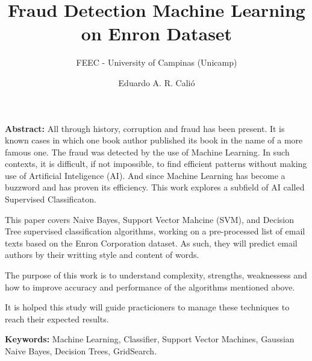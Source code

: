 \documentclass[11pt]{article}
\title{Fraud Detection Machine Learning on Enron Dataset}
\author{Eduardo A. R. Calió}
\subtitle{FEEC - University of Campinas (Unicamp)}
\begin{document}
    
    
    \maketitle
  
\begin{footnotesize}
\textbf{Abstract:} All through history, corruption and fraud has been present. It is known
cases in which one book author published its book in the name of a more
famous one. The fraud was detected by the use of Machine Learning. In
such contexts, it is difficult, if not impossible, to find efficient
patterns without making use of Artificial Inteligence (AI). And since
Machine Learning has become a buzzword and has proven its efficiency.
This work explores a subfield of AI called Supervised Classificaton.

This paper covers Naive Bayes, Support Vector Mahcine (SVM), and
Decision Tree supervised classification algorithms, working on a
pre-processed list of email texts based on the Enron Corporation
dataset. As such, they will predict email authors by their writting
style and content of words.

The purpose of this work is to understand complexity, strengths,
weaknessess and how to improve accuracy and performance of the
algorithms mentioned above.

It is holped this study will guide practicioners to manage these
techniques to reach their expected results.

\textbf{Keywords:} Machine Learning, Classifier, Support Vector
Machines, Gaussian Naive Bayes, Decision Trees, GridSearch.
\end{footnotesize}
\end{document}
